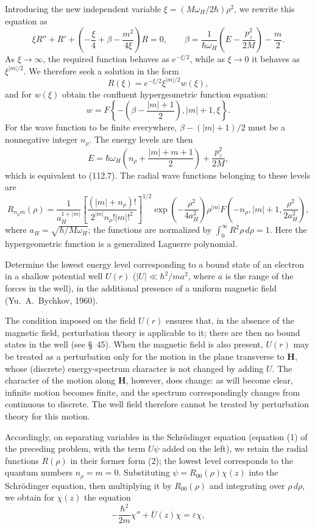 Introducing the new independent variable $\xi=(M\omega_H/2\hbar)\rho^2$, we rewrite this equation as
\[
 \xi R''+R'+\left(-\frac\xi4+\beta-\frac{m^2}{4\xi}\right)R=0,\qquad
 \beta=\frac1{\hbar\omega_H}\left(E-\frac{p_z^2}{2M}\right)-\frac m2.
\]
As $\xi\to\infty$, the required function behaves as $e^{-\xi/2}$, while as $\xi\to0$ it behaves as $\xi^{|m|/2}$. We therefore seek a solution in the form
\[
 R(\xi)=e^{-\xi/2}\xi^{|m|/2}w(\xi),
\]
and for $w(\xi)$ obtain the confluent hypergeometric function equation:
\[
 w=F\left\{-\left(\beta-\frac{|m|+1}{2}\right),|m|+1,\xi\right\}.
\]
For the wave function to be finite everywhere, $\beta-(|m|+1)/2$ must be a nonnegative integer $n_\rho$. The energy levels are then
\[
 E=\hbar\omega_H\left(n_\rho+\frac{|m|+m+1}{2}\right)+\frac{p_z^2}{2M},
\]
which is equivalent to (112.7). The radial wave functions belonging to these levels are
\begin{equation}
 R_{n_\rho m}(\rho)=\frac1{a_H^{1+|m|}}\left[\frac{(|m|+n_\rho)!}{2^{|m|}n_\rho!|m|!^2}\right]^{1/2}\exp\left(-\frac{\rho^2}{4a_H^2}\right)\rho^{|m|}F\left(-n_\rho,|m|+1,\frac{\rho^2}{2a_H^2}\right),
 \tag{2}
\end{equation}
where $a_H=\sqrt{\hbar/M\omega_H}$; the functions are normalized by $\int_0^\infty R^2\rho\,d\rho=1$. Here the hypergeometric function is a generalized Laguerre polynomial.

 Determine the lowest energy level corresponding to a bound state of an electron in a shallow potential well $U(r)$ ($|U|\ll\hbar^2/ma^2$, where $a$ is the range of the forces in the well), in the additional presence of a uniform magnetic field (Yu.~A.~Bychkov, 1960).

\SolutionHeading The condition imposed on the field $U(r)$ ensures that, in the absence of the magnetic field, perturbation theory is applicable to it; there are then no bound states in the well (see \S~45). When the magnetic field is also present, $U(r)$ may be treated as a perturbation only for the motion in the plane transverse to $\mathbf H$, whose (discrete) energy-spectrum character is not changed by adding $U$. The character of the motion along $\mathbf H$, however, does change: as will become clear, infinite motion becomes finite, and the spectrum correspondingly changes from continuous to discrete. The well field therefore cannot be treated by perturbation theory for this motion.

Accordingly, on separating variables in the Schrödinger equation (equation (1) of the preceding problem, with the term $U\psi$ added on the left), we retain the radial functions $R(\rho)$ in their former form (2); the lowest level corresponds to the quantum numbers $n_\rho=m=0$. Substituting $\psi=R_{00}(\rho)\chi(z)$ into the Schrödinger equation, then multiplying it by $R_{00}(\rho)$ and integrating over $\rho\,d\rho$, we obtain for $\chi(z)$ the equation
\begin{equation}
 -\frac{\hbar^2}{2m}\chi''+\overline U(z)\chi=\varepsilon\chi,
 \tag{3}
\end{equation}


